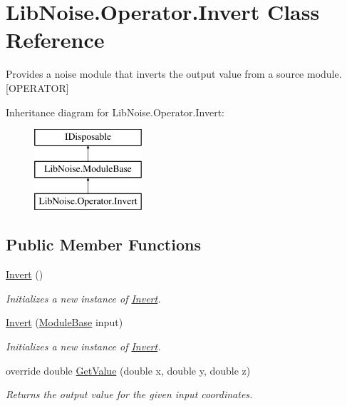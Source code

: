 \hypertarget{class_lib_noise_1_1_operator_1_1_invert}{}\section{Lib\+Noise.\+Operator.\+Invert Class Reference}
\label{class_lib_noise_1_1_operator_1_1_invert}


Provides a noise module that inverts the output value from a source module. \mbox{[}O\+P\+E\+R\+A\+T\+OR\mbox{]}  


Inheritance diagram for Lib\+Noise.\+Operator.\+Invert\+:\begin{figure}[H]
\begin{center}
\leavevmode
\includegraphics[height=3.000000cm]{class_lib_noise_1_1_operator_1_1_invert}
\end{center}
\end{figure}
\subsection*{Public Member Functions}
\begin{DoxyCompactItemize}
\item 
\hyperlink{class_lib_noise_1_1_operator_1_1_invert_af95c50dac5083d38fdb8589614b6ad48}{Invert} ()
\begin{DoxyCompactList}\small\item\em Initializes a new instance of \hyperlink{class_lib_noise_1_1_operator_1_1_invert}{Invert}. \end{DoxyCompactList}\item 
\hyperlink{class_lib_noise_1_1_operator_1_1_invert_aa46cc15f3a4329e8d06665c2685f852f}{Invert} (\hyperlink{class_lib_noise_1_1_module_base}{Module\+Base} input)
\begin{DoxyCompactList}\small\item\em Initializes a new instance of \hyperlink{class_lib_noise_1_1_operator_1_1_invert}{Invert}. \end{DoxyCompactList}\item 
override double \hyperlink{class_lib_noise_1_1_operator_1_1_invert_ab9127cf738be0293bfb21330357f7646}{Get\+Value} (double x, double y, double z)
\begin{DoxyCompactList}\small\item\em Returns the output value for the given input coordinates. \end{DoxyCompactList}\end{DoxyCompactItemize}
